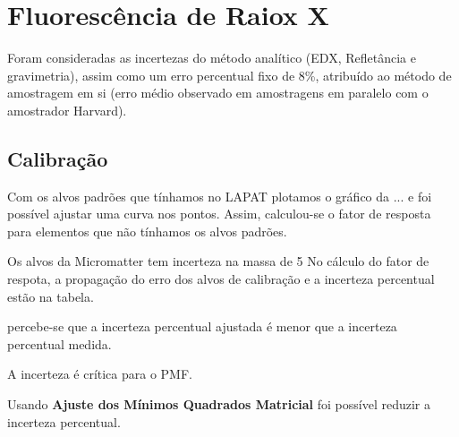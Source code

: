 \section{Fluorescência de Raiox X}


Foram consideradas as 
incertezas do método analítico (EDX, Refletância e gravimetria), 
assim como um erro percentual fixo de 8\%, atribuído ao método de amostragem em si 
(erro médio observado em amostragens em paralelo com o amostrador Harvard).

\subsection{Calibração}

Com os alvos padrões que tínhamos no LAPAT plotamos o gráfico
da ... e foi possível ajustar uma curva nos pontos. 
Assim, calculou-se o fator de resposta para elementos que 
não tínhamos os alvos padrões. 

Os alvos da Micromatter tem incerteza na massa de 5%
No cálculo do fator de respota, a propagação do erro dos alvos de calibração
e a incerteza percentual estão na tabela. 

percebe-se que a incerteza percentual ajustada é menor que 
a incerteza percentual medida. 

A incerteza é crítica para o PMF. 

Usando \textbf{Ajuste dos Mínimos Quadrados Matricial} foi possível
reduzir a incerteza percentual.  

\begin{table}[H]
 
  \begin{scriptsize} %
  \caption{}
  
  \end{scriptsize}
\end{table}

\begin{table}[H]
  
  \begin{scriptsize} %
  \caption{}
  
  \end{scriptsize}
\end{table}


\begin{table}[H]
  
  \begin{footnotesize} %
  \caption{}
  
  \end{footnotesize}
\end{table}

